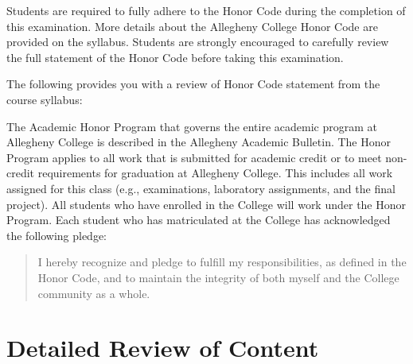 \noindent Students are required to fully adhere to the Honor Code during the completion of this examination. More details about
the Allegheny College Honor Code are provided on the syllabus. Students are strongly encouraged to carefully review the
full statement of the Honor Code before taking this examination.

\noindent The following provides you with a review of Honor Code statement from the course syllabus:

The Academic Honor Program that governs the entire academic program at Allegheny College is described in the Allegheny
Academic Bulletin.  The Honor Program applies to all work that is submitted for academic credit or to meet non-credit
requirements for graduation at Allegheny College.  This includes all work assigned for this class (e.g., examinations,
  laboratory assignments, and the final project).  All students who have enrolled in the College will work under the Honor
Program.  Each student who has matriculated at the College has acknowledged the following pledge:

\vspace*{-.11in}
\begin{quote}
  I hereby recognize and pledge to fulfill my responsibilities, as defined in the Honor Code, and to maintain the
  integrity of both myself and the College community as a whole.
\end{quote}
\vspace*{-.11in}


\vspace*{-.15in}
\section*{Detailed Review of Content}
\vspace*{-.1in}

